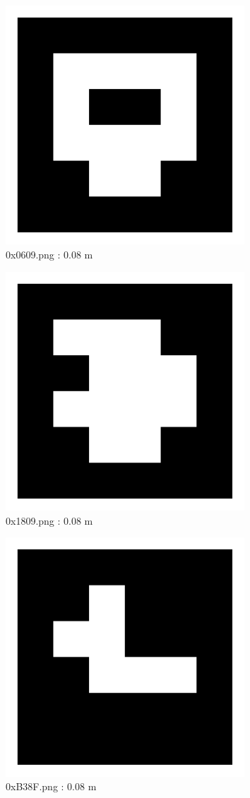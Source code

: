 \documentclass[11pt,a4,BCOR=0cm]{scrartcl}
\begin{document}
\begin{figure}
  \centering
    \includegraphics[width=8.955cm]{0x0609.pdf}
    \caption{0x0609.png : 0.08 m}
    \label{fig:0x0609.pdf}
  
\end{figure} 

\clearpage

\begin{figure}
  \centering
    \includegraphics[width=8.955cm]{0x1809.pdf}
    \caption{0x1809.png : 0.08 m}
    \label{fig:0x1809.pdf}
  
\end{figure} 

\begin{figure}
  \centering
    \includegraphics[width=8.955cm]{0xB38F.pdf}
    \caption{0xB38F.png : 0.08 m}
    \label{fig:0xB38F.pdf}
  
\end{figure} 
\end{document}
